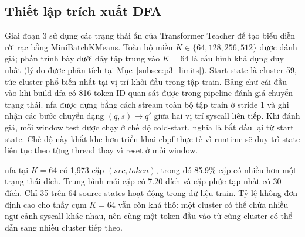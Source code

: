 \documentclass[../main.tex]{subfiles}
\begin{document}
\subsection{Thiết lập trích xuất DFA}
\label{subsec:p3_setup}

Giai đoạn 3 sử dụng các trạng thái ẩn của Transformer Teacher để tạo
biểu diễn rời rạc
bằng MiniBatchKMeans. Toàn bộ miền $K \in \{64, 128, 256, 512\}$ được
đánh giá; phần trình bày dưới đây tập trung vào $K = 64$ là cấu hình
khả dụng duy nhất (lý do được phân tích tại Mục~\ref{subsec:p3_limits}).
Start state là cluster 59, tức cluster phổ biến nhất tại vị trí
khởi đầu trong tập train. Bảng chữ cái đầu vào khi build \gls{dfa} có 816
token ID quan sát
được trong pipeline
đánh giá chuyển trạng thái. \Gls{nfa} được dựng bằng cách stream toàn bộ
tập train ở stride
1 và ghi nhận các bước chuyển dạng $(q, s) \rightarrow q'$ giữa hai
vị trí \gls{syscall} liên
tiếp. Khi đánh giá, mỗi window test được chạy ở chế độ cold-start,
nghĩa là bắt đầu lại
từ start state. Chế độ này khắt khe hơn triển khai \gls{ebpf} thực tế vì
runtime sẽ duy trì
state liên tục theo từng thread thay vì reset ở mỗi window.

\Gls{nfa} tại $K=64$ có 1,973 cặp $(src, token)$, trong đó 85.9\% cặp có
nhiều hơn một trạng
thái đích. Trung bình mỗi cặp có 7.20 đích và cặp phức tạp nhất có 30
đích. Chỉ 35 trên
64 source states hoạt động trong dữ liệu train. Tỷ lệ không đơn định
cao cho thấy cụm
$K=64$ vẫn còn khá thô: một cluster có thể chứa nhiều ngữ cảnh
\gls{syscall} khác nhau, nên
cùng một token đầu vào từ cùng cluster có thể dẫn sang nhiều cluster tiếp theo.
\end{document}
